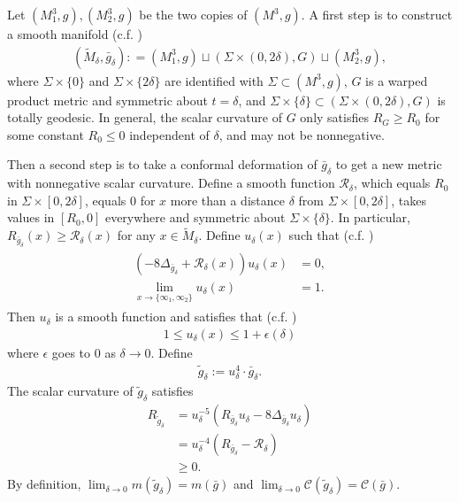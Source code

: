 \documentclass[letter]{amsart}
\theoremstyle{definition}
\theoremstyle{remark}
\begin{document}
Let $(M_1^3, g), (M_2^3,g)$ be the two copies of $(M^3, g)$. A first step is to construct a smooth manifold (c.f. \cite[Equation (92)]{Bray'01})
\begin{align*}
	(\tilde{M}_\delta, \bar{g}_\delta) : = (M_1^{3}, g) \sqcup (\Sigma \times (0, 2 \delta ), G) \sqcup (M_2^3, g),
\end{align*}
where $\Sigma \times \{0\} $ and $\Sigma \times \{2\delta \} $ are identified with $\Sigma \subset (M^3, g)$, $G$ is a warped product metric and symmetric about $t = \delta $, and $\Sigma \times \{\delta \} \subset (\Sigma \times (0, 2\delta ), G)$ is totally geodesic. In general, the scalar curvature of $G$ only satisfies $R_G \geq R_0$ for some constant $R_0 \leq 0$ independent of $\delta $, and may not be nonnegative. 

Then a second step is to take a conformal deformation of $\bar{g}_\delta $ to get a new metric with nonnegative scalar curvature. Define a smooth function $\mathcal{R}_\delta $, which equals $R_0$ in $\Sigma \times [0, 2\delta ]$, equals $0$ for $x$ more than a distance $\delta $ from $\Sigma \times [0, 2\delta ]$, takes values in $[R_0, 0]$ everywhere and symmetric about $\Sigma \times \{\delta \} $. In particular, $R_{\bar{g}_\delta }(x) \geq \mathcal{R}_\delta (x)$ for any $x \in \tilde{M}_\delta $. Define $u_\delta (x)$ such that (c.f. \cite[Equation (101)]{Bray'01})
\begin{align}\label{u_delta}
	\begin{split}
	(-8 \Delta _{\bar{g}_\delta } + \mathcal{R}_\delta (x) ) u_\delta (x) &=0, \\
	\lim_{x\to \{\infty_1, \infty_2\} } u_\delta (x) &=1.
\end{split}
\end{align}
Then $u_\delta $ is a smooth function and satisfies that (c.f. \cite[Equation (102)]{Bray'01})
\begin{align*}
	1 \leq u_\delta (x) \leq 1 + \epsilon (\delta )
\end{align*}
where $\epsilon $ goes to $0$ as $\delta \to 0$. Define 
\begin{align*}
	\tilde{g}_\delta := u_\delta ^{4} \cdot \bar{g}_\delta.
\end{align*}
The scalar curvature of $\tilde{g}_\delta $ satisfies 
\begin{align*}
	R_{\tilde{g}_\delta }&= u_\delta ^{-5} \left( R_{\bar{g}_\delta } u_\delta  - 8 \Delta _{\bar{g}_\delta } u_\delta  \right) \\
	& = u_\delta ^{-4} \left( R_{\bar{g}_\delta } - \mathcal{R}_\delta  \right) \\
	& \geq 0.
\end{align*}
By definition, $\lim_{\delta \to 0} m(\tilde{g}_\delta ) = m(\bar{g})$ and $\lim_{\delta \to 0} \mathcal{C}(\tilde{g}_\delta) = \mathcal{C}(\bar{g})$. 
\end{document}
